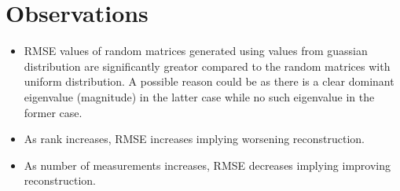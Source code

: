 \documentclass[a4paper]{article}
\begin{document}
\section{Observations}
\begin{itemize}
\item RMSE values of random matrices generated using values from guassian distribution are significantly greator compared to the random matrices with uniform distribution. A possible reason could be as there is a clear dominant eigenvalue (magnitude) in the latter case while no such eigenvalue in the former case.
\item As rank increases, RMSE increases implying worsening reconstruction.
\item As number of measurements increases, RMSE decreases implying improving reconstruction.
\end{itemize}
\end{document}
